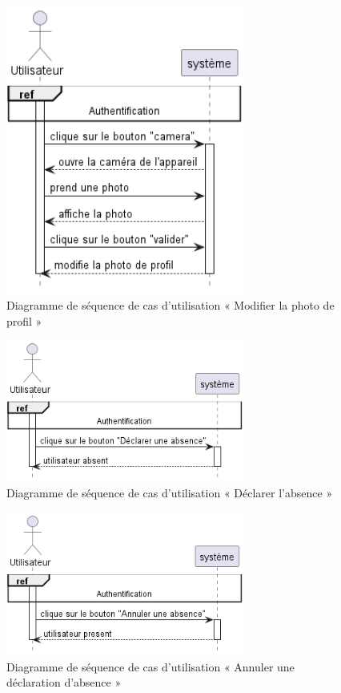 \begin{figure}[H]
  \centering
  \includegraphics[width=0.7\textwidth]{out/diagrams/sprint6/edit_profil_avatar/edit_profil_avatar}
  \caption{Diagramme de séquence de cas d'utilisation « Modifier la photo de profil »}
  \label{fig:sequence_edit_profil_avatar}
\end{figure}

\begin{figure}[H]
  \centering
  \includegraphics[width=0.7\textwidth]{out/diagrams/sprint6/declare_absence/declare_absence}
  \caption{Diagramme de séquence de cas d'utilisation « Déclarer l'absence »}
  \label{fig:sequence_declare_absence}
\end{figure}

\begin{figure}[H]
  \centering
  \includegraphics[width=0.7\textwidth]{out/diagrams/sprint6/annuler_absence/annuler_absence}
  \caption{Diagramme de séquence de cas d'utilisation « Annuler une déclaration d'absence »}
  \label{fig:sequence_annuler_absence}
\end{figure}

